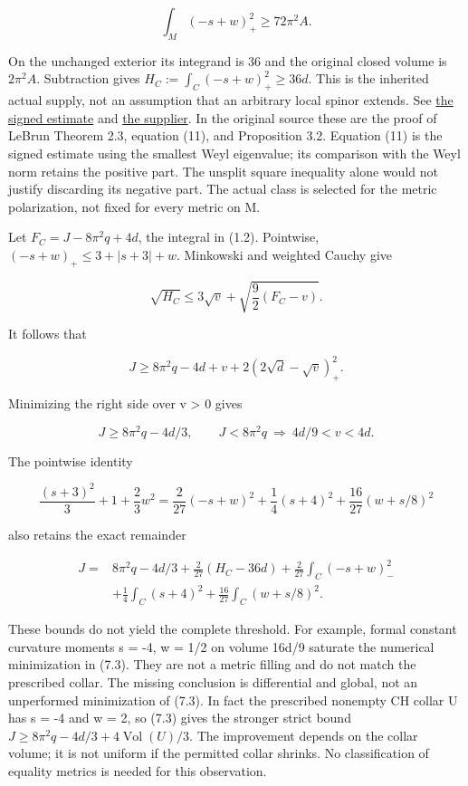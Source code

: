 \documentclass[
  10pt,
]{article}
\begin{document}
\[
 \int_M(-s+w)_+^2\ge72\pi^2 A.
\]

On the unchanged exterior its integrand is 36 and the original closed
volume is \(2\pi^2A\). Subtraction gives
\(H_C:=\int_C(-s+w)_+^2\ge36d\). This is the inherited actual supply,
not an assumption that an arbitrary local spinor extends. See
\href{../mathematics/current/line1_functional_pencil.md}{the signed
estimate} and
\href{../mathematics/current/lebrun_stability_closure.md}{the supplier}.
In the original source these are the proof of LeBrun Theorem 2.3,
equation (11), and Proposition 3.2. Equation (11) is the signed estimate
using the smallest Weyl eigenvalue; its comparison with the Weyl norm
retains the positive part. The unsplit square inequality alone would not
justify discarding its negative part. The actual class is selected for
the metric polarization, not fixed for every metric on M.

Let \(F_C=J-8\pi^2q+4d\), the integral in (1.2). Pointwise,
\((-s+w)_+\le3+|s+3|+w\). Minkowski and weighted Cauchy give

\[
 \sqrt{H_C}\le3\sqrt v+
 \sqrt{\frac92(F_C-v)}.
\]

It follows that

\[
 \boxed{J\ge8\pi^2q-4d+v+2(2\sqrt d-\sqrt v)_+^2.}             \tag{7.1}
\]

Minimizing the right side over v \textgreater{} 0 gives

\[
 J\ge8\pi^2q-4d/3,\qquad
 J<8\pi^2q\ \Longrightarrow\ 4d/9<v<4d.                       \tag{7.2}
\]

The pointwise identity

\[
 \frac{(s+3)^2}{3}+1+\frac23w^2
 =\frac2{27}(-s+w)^2+\frac14(s+4)^2
                            +\frac{16}{27}(w+s/8)^2
\]

also retains the exact remainder

\[
\begin{aligned}
 J={}&8\pi^2q-4d/3+\frac2{27}(H_C-36d)
 +\frac2{27}\int_C(-s+w)_-^2\\
 &+\frac14\int_C(s+4)^2
 +\frac{16}{27}\int_C(w+s/8)^2.
\end{aligned}                                             \tag{7.3}
\]

These bounds do not yield the complete threshold. For example, formal
constant curvature moments s = -4, w = 1/2 on volume 16d/9 saturate the
numerical minimization in (7.3). They are not a metric filling and do
not match the prescribed collar. The missing conclusion is differential
and global, not an unperformed minimization of (7.3). In fact the
prescribed nonempty CH collar U has s = -4 and w = 2, so (7.3) gives the
stronger strict bound \(J\ge8\pi^2q-4d/3+4\operatorname{Vol}(U)/3\). The
improvement depends on the collar volume; it is not uniform if the
permitted collar shrinks. No classification of equality metrics is
needed for this observation.
\end{document}
